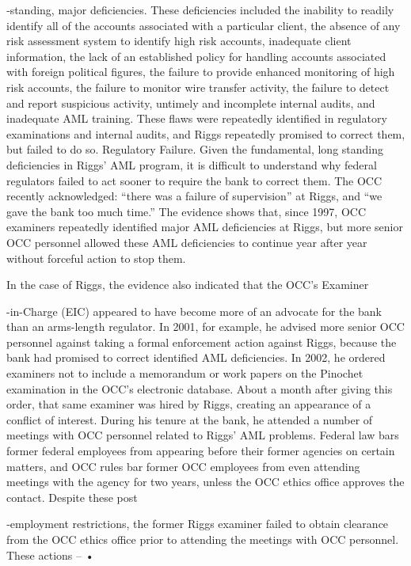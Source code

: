 ‐standing, major
deficiencies. These deficiencies included the inability to readily identify all of the accounts associated
with a particular client, the absence of any risk assessment system to identify high risk accounts,
inadequate client information, the lack of an established policy for handling accounts associated
with foreign political figures, the failure to provide enhanced monitoring of high risk accounts, the
failure to monitor wire transfer activity, the failure to detect and report suspicious activity, untimely
and incomplete internal audits, and inadequate AML training. These flaws were repeatedly identified
in regulatory examinations and internal audits, and Riggs repeatedly promised to correct them, but
failed to do so.
Regulatory Failure.
Given the fundamental, long standing deficiencies in Riggs’ AML program, it is difficult to understand
why federal regulators failed to act sooner to require the bank to correct them. The OCC recently
acknowledged: “there was a failure of supervision” at Riggs, and “we gave the bank too much time.”
The evidence shows that, since 1997, OCC examiners repeatedly identified major AML deficiencies at
Riggs, but more senior OCC personnel allowed these AML deficiencies to continue year after year
without forceful action to stop them.
 
In the case of Riggs, the evidence also indicated that the OCC’s Examiner

-in-Charge (EIC) appeared to have become more of an advocate for the bank than an arms-length regulator. In 2001, for example,
he advised more senior OCC personnel against taking a formal enforcement action against Riggs,
because the bank had promised to correct identified AML deficiencies. In 2002, he ordered
examiners not to include a memorandum or work papers on the Pinochet examination in the OCC’s
electronic database. About a month after giving this order, that same examiner was hired by Riggs,
creating an appearance of a conflict of interest. During his tenure at the bank, he attended a number
of meetings with OCC personnel related to Riggs’ AML problems. Federal law bars former federal
employees from appearing before their former agencies on certain matters, and OCC rules bar
former OCC employees from even attending meetings with the agency for two years, unless the OCC
ethics office approves the contact.
Despite these post

‐employment restrictions, the former Riggs examiner failed to obtain clearance
from the OCC ethics office prior to attending the meetings with OCC personnel. These actions –
•


